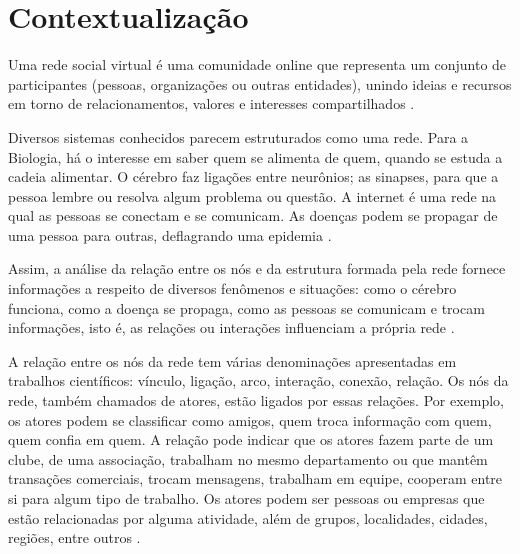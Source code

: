 









\frenchspacing 
\imprimircapa


\textual

\section*{Contextualização}
\label{sec:contextualizacao}

Uma rede social virtual é uma comunidade online que representa um conjunto de participantes (pessoas, organizações ou outras entidades), unindo ideias e recursos em torno de relacionamentos, valores e interesses compartilhados \cite{Marteleto:2001}.

Diversos sistemas conhecidos parecem estruturados como uma rede. Para a Biologia, há o interesse em saber quem se alimenta de quem, quando se estuda a cadeia alimentar. O cérebro faz ligações entre neurônios; as sinapses, para que a pessoa lembre ou resolva algum problema ou questão. A internet é uma rede na qual as pessoas se conectam e se comunicam. As doenças podem se propagar de uma pessoa para outras, deflagrando uma epidemia \cite{Goular:2014}.

Assim, a análise da relação entre os nós e da estrutura formada pela rede fornece informações a respeito de diversos fenômenos e situações: como o cérebro funciona, como a doença se propaga, como as pessoas se comunicam e trocam informações, isto é, as relações ou interações influenciam a própria rede \cite{Goular:2014}.

A relação entre os nós da rede tem várias denominações apresentadas em trabalhos científicos: vínculo, ligação, arco, interação, conexão, relação. Os nós da rede, também chamados de atores, estão ligados por essas relações. Por exemplo, os atores podem se classificar como amigos, quem troca informação com quem, quem confia em quem. A relação pode indicar que os atores fazem parte de um clube, de uma associação, trabalham no mesmo departamento ou que mantêm transações comerciais, trocam mensagens, trabalham em equipe, cooperam entre si para algum tipo de trabalho. Os atores podem ser pessoas ou empresas que estão relacionadas por alguma atividade, além de grupos, localidades, cidades, regiões, entre outros \cite{Hanneman:Riddle:2005}.


